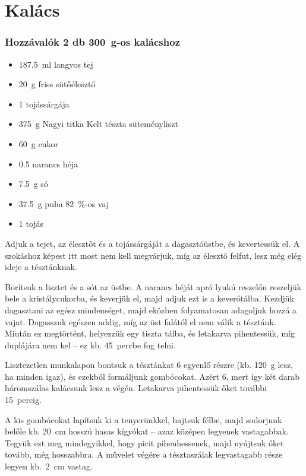 \newpage
\section{Kalács} \label{sec:kalacs}

\subsubsection*{Hozzávalók 2 db \qty{300}{\g}-os kalácshoz}
\begin{itemize}
    \item \qty{187.5}{\ml} langyos tej
    \item \qty{20}{\g} friss sütőélesztő
    \item \num{1} tojássárgája
    \item \qty{375}{\g} Nagyi titka Kelt tészta süteményliszt
    \item \qty{60}{\g} cukor
    \item \num{0.5} narancs héja
    \item \qty{7.5}{\g} só
    \item \qty{37.5}{\g} puha \qty{82}{\percent}-os vaj
    \item \num{1} tojás
\end{itemize}

Adjuk a tejet, az élesztőt és a tojássárgáját a dagasztóüstbe, és kevertessük el. A szokáshoz képest itt most nem kell megvárjuk, míg az élesztő felfut, lesz még elég ideje a tésztánknak.

Borítsuk a lisztet és a sót az üstbe. A narancs héját apró lyukú reszelőn reszeljük bele a kristálycukorba, és keverjük el, majd adjuk ezt is a keverőtálba. Kezdjük dagasztani az egész mindenséget, majd eközben folyamatosan adagoljuk hozzá a vajat. Dagasszuk egészen addig, míg az üst falától el nem válik a tésztánk. Miután ez megtörtént, helyezzük egy tiszta tálba, és letakarva pihentessük, míg duplájára nem kel -- ez kb. \num{45}~percbe fog telni.

Lisztezetlen munkalapon bontsuk a tésztánkat 6 egyenlő részre (kb. \qty{120}{\g} lesz, ha minden igaz), és ezekből formáljunk gombócokat. Azért 6, mert így két darab háromszálas kalácsunk lesz a végén. Letakarva pihentessük őket további \num{15}~percig.

A kis gombócokat lapítsuk ki a tenyerünkkel, hajtsuk félbe, majd sodorjunk belőle kb. \qty{20}{\cm} hosszú hasas kígyókat -- azaz középen legyenek vastagabbak. Tegyük ezt meg mindegyikkel, hogy picit pihenhessenek, majd nyújtsuk őket tovább, még hosszabbra. A művelet végére a tésztaszálak legvastagabb része legyen kb.~\qty{2}{\cm} vastag.

